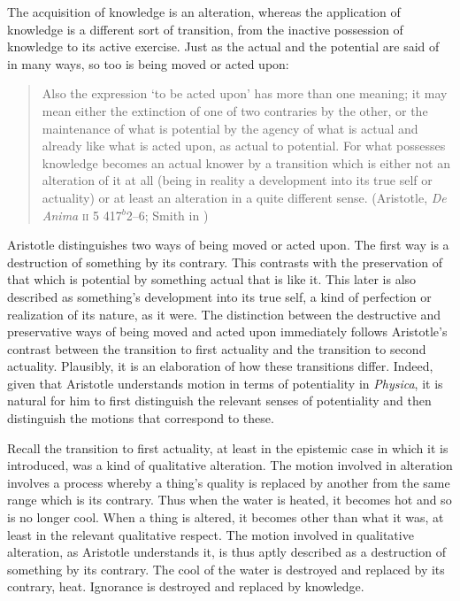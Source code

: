 The acquisition of knowledge is an alteration, whereas the application of knowledge is a different sort of transition, from the inactive possession of knowledge to its active exercise. Just as the actual and the potential are said of in many ways, so too is being moved or acted upon:
\begin{quote}
	Also the expression `to be acted upon' has more than one meaning; it may mean either the extinction of one of two contraries by the other, or the maintenance of what is potential by the agency of what is actual and already like what is acted upon, as actual to potential. For what possesses knowledge becomes an actual knower by a transition which is either not an alteration of it at all (being in reality a development into its true self or actuality) or at least an alteration in a quite different sense. (Aristotle, \emph{De Anima} \textsc{ii} 5 417\( ^{b} \)2--6; Smith in \citealt[30]{Barnes:1984uq})
\end{quote}
Aristotle distinguishes two ways of being moved or acted upon. The first way is a destruction of something by its contrary. This contrasts with the preservation of that which is potential by something actual that is like it. This later is also described as something's development into its true self, a kind of perfection or realization of its nature, as it were. The distinction between the destructive and preservative ways of being moved and acted upon immediately follows Aristotle's contrast between the transition to first actuality and the transition to second actuality. Plausibly, it is an elaboration of how these transitions differ. Indeed, given that Aristotle understands motion in terms of potentiality in \emph{Physica}, it is natural for him to first distinguish the relevant senses of potentiality and then distinguish the motions that correspond to these.

Recall the transition to first actuality, at least in the epistemic case in which it is introduced, was a kind of qualitative alteration. The motion involved in alteration involves a process whereby a thing's quality is replaced by another from the same range which is its contrary. Thus when the water is heated, it becomes hot and so is no longer cool. When a thing is altered, it becomes other than what it was, at least in the relevant qualitative respect. The motion involved in qualitative alteration, as Aristotle understands it, is thus aptly described as a destruction of something by its contrary. The cool of the water is destroyed and replaced by its contrary, heat. Ignorance is destroyed and replaced by knowledge.

